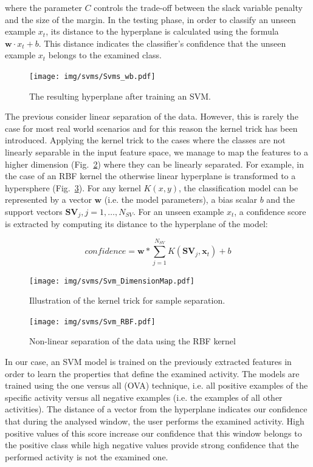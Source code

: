 \noindent where the parameter $C$ controls the trade-off between the
slack variable penalty and the size of the margin. In the testing
phase, in order to classify an unseen example $x_t$, its distance to
the hyperplane is calculated using the formula $\mathbf{w}\cdot x_t +
b$. This distance indicates the classifier's confidence that the
unseen example $x_t$ belongs to the examined class.

\begin{figure}[h]
\centering
  \texttt{[image: img/svms/Svms\_wb.pdf]}
  \caption{The resulting hyperplane after training an SVM.}
  \label{fig:svm_wb}
\end{figure}

The previous consider linear separation of the data. However, this is
rarely the case for most real world scenarios and for this reason the
kernel trick has been introduced. Applying the kernel trick to the
cases where the classes are not linearly separable in the input
feature space, we manage to map the features to a higher dimension
(Fig.~\ref{fig:svm_highDim}) where they can be linearly separated. For
example, in the case of an RBF kernel the otherwise linear hyperplane
is transformed to a hypersphere (Fig.~\ref{fig:svm_rbf}). For any
kernel $K(x,y)$, the classification model can be represented by a
vector $\textbf{w}$ (i.e. the model parameters), a bias scalar $b$ and
the support vectors $\mathbf{SV}_j, j=1,\ldots,N_{SV}$. For an unseen
example $x_t$, a confidence score is extracted by computing its
distance to the hyperplane of the model:

\begin{equation}\label{Eq:SVMdecision}
  confidence = \mathbf{w}*\sum_{j=1}^{N_{SV}}{K(\mathbf{SV}_j,\mathbf{x}_t)}+b
\end{equation}

\begin{figure}[h]
\centering
  \texttt{[image: img/svms/Svm\_DimensionMap.pdf]}
  \caption{Illustration of the kernel trick for sample separation.}
  \label{fig:svm_highDim}
\end{figure}

\begin{figure}[h]
\centering
  \texttt{[image: img/svms/Svm\_RBF.pdf]}
  \caption{Non-linear separation of the data using the RBF kernel}
  \label{fig:svm_rbf}
\end{figure}


In our case, an SVM model is trained on the previously extracted
features in order to learn the properties that define the examined
activity. The models are trained using the one versus all (OVA)
technique, i.e. all positive examples of the specific activity versus
all negative examples (i.e. the examples of all other activities). The
distance of a vector from the hyperplane indicates our confidence that
during the analysed window, the user performs the examined
activity. High positive values of this score increase our confidence
that this window belongs to the positive class while high negative
values provide strong confidence that the performed activity is not
the examined one.

